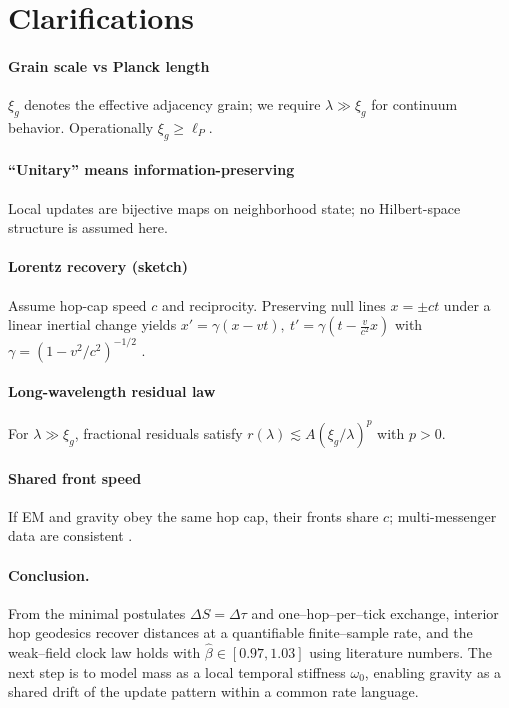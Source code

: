 \section*{Clarifications}
\paragraph{Grain scale vs Planck length}
\(\xi_g\) denotes the effective adjacency grain; we require \(\lambda\gg\xi_g\) for continuum behavior. Operationally \(\xi_g\ge \ell_P\).
\paragraph{``Unitary'' means information-preserving}
Local updates are bijective maps on neighborhood state; no Hilbert-space structure is assumed here.
\paragraph{Lorentz recovery (sketch)}
Assume hop-cap speed \(c\) and reciprocity. Preserving null lines \(x=\pm ct\) under a linear inertial change yields
\(x'=\gamma(x-vt),\ t'=\gamma(t-\frac{v}{c^2}x)\) with \(\gamma=(1-v^2/c^2)^{-1/2}\) \cite{einstein1905electrodynamics}.
\paragraph{Long-wavelength residual law}
For \(\lambda\gg\xi_g\), fractional residuals satisfy \(r(\lambda)\lesssim A(\xi_g/\lambda)^p\) with \(p>0\).
\paragraph{Shared front speed}
If EM and gravity obey the same hop cap, their fronts share \(c\); multi-messenger data are consistent \cite{abbott2017gw170817_ligo,abbott2017grb170817a}.

\paragraph{Conclusion.}
From the minimal postulates $\Delta S=\Delta\tau$ and one--hop--per--tick exchange, interior hop geodesics recover distances at a quantifiable finite--sample rate, and the weak--field clock law holds with $\hat\beta\in[0.97,1.03]$ using literature numbers. The next step is to model mass as a local temporal stiffness $\omega_0$, enabling gravity as a shared drift of the update pattern within a common rate language.